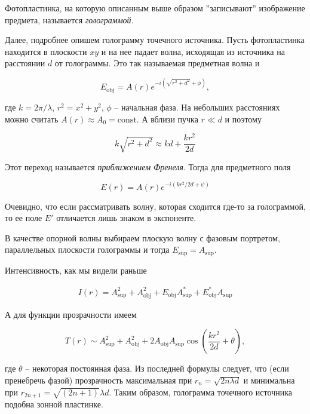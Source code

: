\documentclass[a4paper,12pt]{article}
\begin{document}
Фотопластинка, на которую описанным выше образом ''записывают'' изображение предмета, называется \emph{голограммой}.

Далее, подробнее опишем голограмму точечного источника. Пусть фотопластинка находится в плоскости $xy$ и на нее падает волна, исходящая из источника на расстоянии $d$ от голограммы. Это так называемая предметная волна и

\begin{equation}
	E_{\mathrm{obj}}=A(r)e^{-i\left( \sqrt{r^2+d^2}+\phi\right) },
\end{equation}

где $k=2\pi/\lambda$, $r^2=x^2+y^2$, $\phi$ -- начальная фаза. На небольших расстояниях можно считать $A(r)\approx A_0=\mathrm{const}$. А вблизи пучка $r\ll d$ и поэтому

\begin{equation}
	k\sqrt{r^2+d^2}\approx kd+\frac{kr^2}{2d}
\end{equation}

Этот переход называется \emph{приближением Френеля}. Тогда для предметного поля

\begin{equation}
	E(r)=A(r)e^{-i\left(kr^2/2d+\psi \right) }
\end{equation}

Очевидно, что если рассматривать волну, которая сходится где-то за голограммой, то ее поле $E'$ отличается лишь знаком в экспоненте. 

В качестве опорной волны выбираем плоскую волну с фазовым портретом, параллельных плоскости голограммы и тогда $E_{\mathrm{sup}}=A_{\sup}$.

Интенсивность, как мы видели раньше

\begin{eqnarray}
	I(r)=A_{\sup}^2+A_{\mathrm{obj}}^2+E_{\mathrm{obj}}A^*_{\sup}+E^*_{\mathrm{obj}}A_{\sup}
\end{eqnarray}

А для функции прозрачности имеем

\begin{equation}
	T(r)\sim A_{\sup}^2+A_{\mathrm{obj}}^2+2A_{\mathrm{obj}}A_{\sup}\cos\left(\frac{kr^2}{2d}+\theta\right),
\end{equation}

где $\theta$ -- некоторая постоянная фаза.  Из последней формулы следует, что (если пренебречь фазой) прозрачность максимальная при $r_n=\sqrt{2n\lambda d}$ и минимальна при $r_{2n+1}=\sqrt{(2n+1)}\lambda d$. Таким образом, голограмма точечного источника подобна зонной пластинке.
\end{document}
